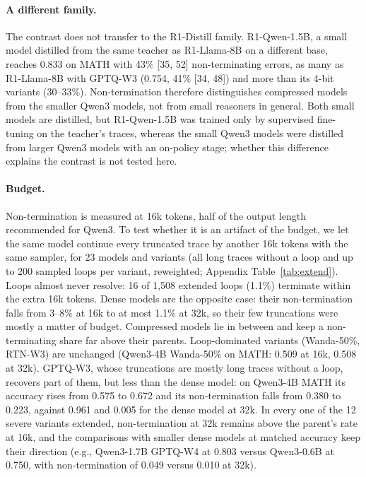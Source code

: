 \documentclass[10pt]{article}
\begin{document}
\paragraph{A different family.}
The contrast does not transfer to the R1-Distill family. R1-Qwen-1.5B, a small model distilled from the same teacher as R1-Llama-8B on a different base, reaches 0.833 on MATH with 43\% [35, 52] non-terminating errors, as many as R1-Llama-8B with GPTQ-W3 (0.754, 41\% [34, 48]) and more than its 4-bit variants (30--33\%). Non-termination therefore distinguishes compressed models from the smaller Qwen3 models, not from small reasoners in general. Both small models are distilled, but R1-Qwen-1.5B was trained only by supervised fine-tuning on the teacher's traces, whereas the small Qwen3 models were distilled from larger Qwen3 models with an on-policy stage; whether this difference explains the contrast is not tested here.

\paragraph{Budget.}
Non-termination is measured at 16k tokens, half of the output length recommended for Qwen3. To test whether it is an artifact of the budget, we let the same model continue every truncated trace by another 16k tokens with the same sampler, for 23 models and variants (all long traces without a loop and up to 200 sampled loops per variant, reweighted; Appendix Table~\ref{tab:extend}). Loops almost never resolve: 16 of 1,508 extended loops (1.1\%) terminate within the extra 16k tokens. Dense models are the opposite case: their non-termination falls from 3--8\% at 16k to at most 1.1\% at 32k, so their few truncations were mostly a matter of budget. Compressed models lie in between and keep a non-terminating share far above their parents. Loop-dominated variants (Wanda-50\%, RTN-W3) are unchanged (Qwen3-4B Wanda-50\% on MATH: 0.509 at 16k, 0.508 at 32k). GPTQ-W3, whose truncations are mostly long traces without a loop, recovers part of them, but less than the dense model: on Qwen3-4B MATH its accuracy rises from 0.575 to 0.672 and its non-termination falls from 0.380 to 0.223, against 0.961 and 0.005 for the dense model at 32k. In every one of the 12 severe variants extended, non-termination at 32k remains above the parent's rate at 16k, and the comparisons with smaller dense models at matched accuracy keep their direction (e.g., Qwen3-1.7B GPTQ-W4 at 0.803 versus Qwen3-0.6B at 0.750, with non-termination of 0.049 versus 0.010 at 32k).
\end{document}
